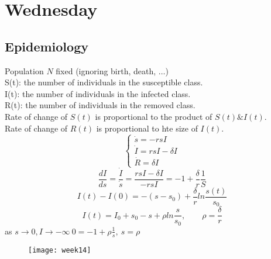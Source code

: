 \section{Wednesday}
\subsection{Epidemiology}
Population $N$ fixed (ignoring birth, death, $\dots$)\\
S(t): the number of individuals in the susceptible class.\\
I(t): the number of individuals in the infected class.\\
R(t): the number of individuals in the removed class.\\
Rate of change of $S(t)$ is proportional to the product of $S(t)\&I(t)$.\\
Rate of change of $R(t)$ is proportional to hte size of $I(t)$.\\
\[\begin{cases}\dot{s}=-rsI\\\dot{I}=rsI-\delta I\\\dot{R}=\delta I\end{cases}
\]
\[\frac{dI}{ds}=\frac{\dot{I}}{\dot{s}}=\frac{rsI-\delta I}{-rsI}=-1+\frac{\delta}{r}\frac{1}{S}\]
\[I(t)-I(0)=-(s-s_0)+\frac{\delta}{r}ln\frac{s(t)}{s_0}
\]
\[I(t)=I_0+s_0-s+\rho ln\frac{s}{s_0},\qquad \rho=\frac{\delta}{r}
\]
as $s\rightarrow0, I\rightarrow-\infty ~0=-1+\rho\frac{1}{s},~s=\rho$
\begin{figure}[H]
\centering
\texttt{[image: week14]}
\end{figure}









